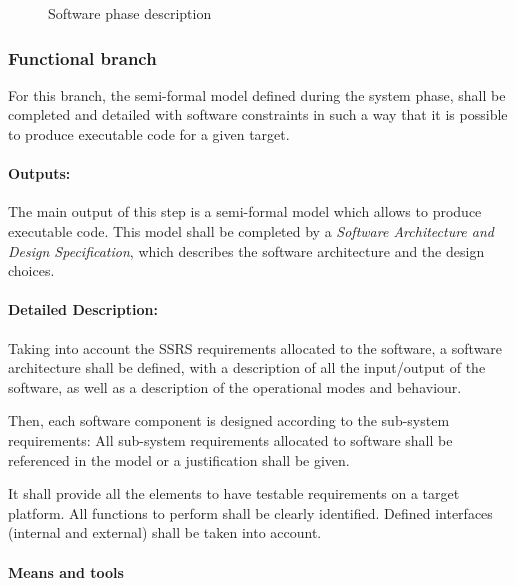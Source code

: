\begin{figure}[h]
  \centering
  \caption{Software phase description}
  \label{fig:detailed software}
\end{figure}


\subsubsection{Functional branch}
\label{sec:sw-func}

For this branch, the semi-formal model  defined during the system phase, shall  be completed and detailed with software constraints in such a way that it is possible to produce executable code for a given target.


\paragraph{Outputs:}
\label{sec:sw-func_out}

The main output of this step  is a semi-formal model which  allows to produce executable code.
This model  shall be completed by a \textit{Software Architecture and Design Specification}, which describes the software architecture and the design choices.


\paragraph{Detailed Description:}
\label{sec:sw-req-deta-descr}

Taking into account the SSRS requirements allocated to  the software, a software architecture shall be defined, with a description of all the input/output of the software, as well as a description of the operational modes and behaviour.

Then, each software component is designed according to  the sub-system  requirements: All sub-system requirements allocated to  software shall be referenced in the model or a justification shall be given.

It shall provide all the elements to have testable requirements on a target platform. All functions to perform shall be clearly identified. Defined interfaces (internal and external) shall be  taken into account.


\paragraph{Means and tools}
\label{sec:sw-means}

